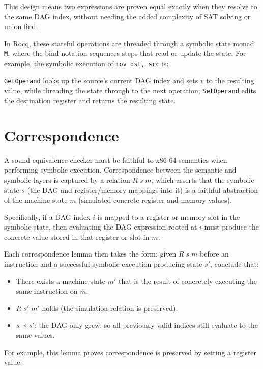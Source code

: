 This design means two expressions are proven equal exactly when they resolve to the same DAG index, without needing the added complexity of SAT solving or union-find.

In Rocq, these stateful operations are threaded through a symbolic state monad \texttt{M}, where the bind notation \bind{} sequences steps that read or update the state.
For example, the symbolic execution of \texttt{mov dst, src} is:


\noindent \texttt{GetOperand} looks up the source's current DAG index and sets $v$ to the resulting value, while threading the state through to the next operation; \texttt{SetOperand} edits the destination register and returns the resulting state.

\section{Correspondence}

A sound equivalence checker must be faithful to x86-64 semantics when performing symbolic execution.
Correspondence between the semantic and symbolic layers is captured by a relation $R\; s\; m$, which asserts that the symbolic state $s$ (the DAG and register/memory mappings into it) is a faithful abstraction of the machine state $m$ (simulated concrete register and memory values). 

Specifically, if a DAG index $i$ is mapped to a register or memory slot in the symbolic state, then evaluating the DAG expression rooted at $i$ must produce the concrete value stored in that register or slot in $m$. 

Each correspondence lemma then takes the form: given $R\; s\; m$ before an instruction and a successful symbolic execution producing state $s'$, conclude that:
\begin{itemize}
    \item There exists a machine state $m'$ that is the result of concretely executing the same instruction on $m$.
    \item $R\; s'\; m'$ holds (the simulation relation is preserved).
    \item $s \prec s'$: the DAG only grew, so all previously valid indices still evaluate to the same values.
\end{itemize}

For example, this lemma proves correspondence is preserved by setting a register value:


